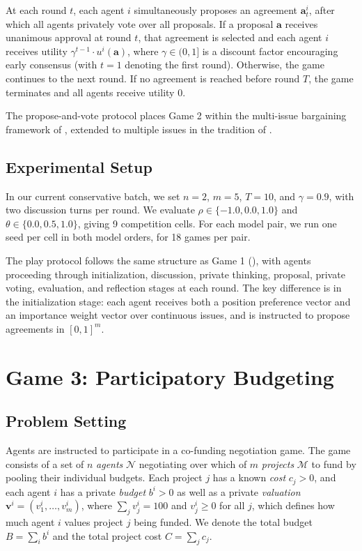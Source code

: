 At each round $t$, each agent $i$ simultaneously proposes an agreement $\bm{a}^{i}_{t}$, after which all agents privately vote over all proposals.
If a proposal $\bm{a}$ receives unanimous approval at round $t$, that agreement is selected and each agent $i$ receives utility $\gamma^{t-1} \cdot u^i(\bm{a})$, where $\gamma \in (0,1]$ is a discount factor encouraging early consensus (with $t=1$ denoting the first round).
Otherwise, the game continues to the next round.
If no agreement is reached before round $T$, the game terminates and all agents receive utility 0.

The propose-and-vote protocol places Game 2 within the multi-issue bargaining framework of \citet{rubinstein1982perfect}, extended to multiple issues in the tradition of \citet{fershtman1990importance}.

\subsection{Experimental Setup}
\label{sec:game_2_experimental_setup}

In our current conservative batch, we set $n = 2$, $m = 5$, $T = 10$, and $\gamma = 0.9$, with two discussion turns per round.
We evaluate $\rho \in \{-1.0, 0.0, 1.0\}$ and $\theta \in \{0.0, 0.5, 1.0\}$, giving 9 competition cells.
For each model pair, we run one seed per cell in both model orders, for 18 games per pair.

The play protocol follows the same structure as Game 1 (), with agents proceeding through initialization, discussion, private thinking, proposal, private voting, evaluation, and reflection stages at each round.
The key difference is in the initialization stage: each agent receives both a position preference vector and an importance weight vector over continuous issues, and is instructed to propose agreements in $[0,1]^m$.

\section{Game 3: Participatory Budgeting}

\subsection{Problem Setting}
\label{sec:game_3_problem_setting}

Agents are instructed to participate in a co-funding negotiation game.
The game consists of a set of $n$ \emph{agents} $\mathcal{N}$ negotiating over which of $m$ \emph{projects} $\mathcal{M}$ to fund by pooling their individual budgets.
Each project $j$ has a known \emph{cost} $c_j > 0$, and each agent $i$ has a private \emph{budget} $b^{i} > 0$ as well as a private \emph{valuation} $\bm{v}^{i} = (v^{i}_{1}, \dots, v^{i}_{m})$, where $\sum_j v^{i}_{j} = 100$ and $v^{i}_{j} \geq 0$ for all $j$, which defines how much agent $i$ values project $j$ being funded.
We denote the total budget $B = \sum_i b^i$ and the total project cost $C = \sum_j c_j$.

